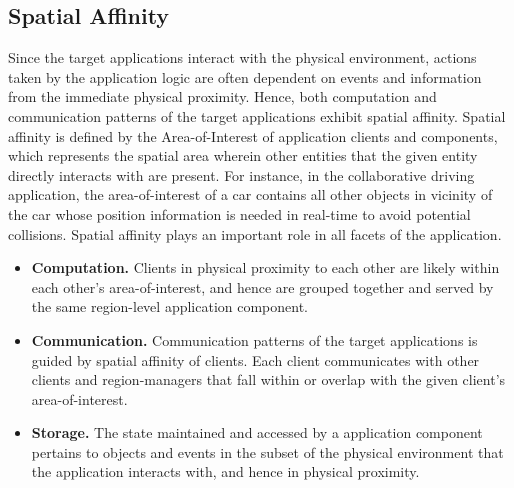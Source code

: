 \subsection{Spatial Affinity}
Since the target applications interact with the physical environment, actions taken by the application logic are often dependent on events and information from the immediate physical proximity. Hence, both computation and communication patterns of the target applications exhibit spatial affinity. Spatial affinity is defined by the Area-of-Interest of application clients and components, which represents the spatial area wherein other entities that the given entity directly interacts with are present. For instance, in the collaborative driving application, the area-of-interest of a car contains all other objects in vicinity of the car whose position information is needed in real-time to avoid potential collisions. Spatial affinity plays an important role in all facets of the application.
\begin{itemize}
\item \textbf{Computation. }Clients in physical proximity to each other are likely within each other's area-of-interest, and hence are grouped together and served by the same region-level application component. 
\item \textbf{Communication. } Communication patterns of the target applications is guided by spatial affinity of clients. Each client communicates with other clients and region-managers that fall within or overlap with the given client's area-of-interest. 
\item \textbf{Storage. }The state maintained and accessed by a application component pertains to objects and events in the subset of the physical environment that the application interacts with, and hence in physical proximity.
\end{itemize}

